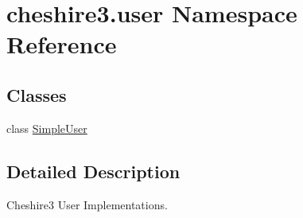 \hypertarget{namespacecheshire3_1_1user}{\section{cheshire3.\-user Namespace Reference}
\label{namespacecheshire3_1_1user}
}
\subsection*{Classes}
\begin{DoxyCompactItemize}
\item 
class \hyperlink{classcheshire3_1_1user_1_1_simple_user}{Simple\-User}
\end{DoxyCompactItemize}


\subsection{Detailed Description}
\begin{DoxyVerb}Cheshire3 User Implementations.\end{DoxyVerb}
 